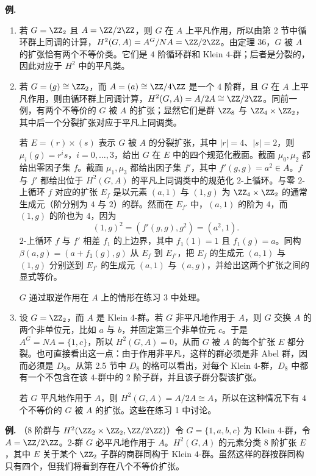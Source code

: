 \noindent\textbf{例.}
\begin{enumerate}[label=(\arabic*)]
  \item 若 $G=\ZZ_2$ 且 $A=\ZZ/2\ZZ$，则 $G$ 在 $A$ 上平凡作用，所以由第 2 节中循环群上同调的计算，$H^2(G,A)=A^G/NA=\ZZ/2\ZZ$。由定理 36，$G$ 被 $A$ 的扩张恰有两个不等价类。它们是 $4$ 阶循环群和 Klein $4$-群；后者是分裂的，因此对应于 $H^2$ 中的平凡类。

  \item 若 $G=(g)\cong\ZZ_2$，而 $A=(a)\cong\ZZ/4\ZZ$ 是一个 $4$ 阶群，且 $G$ 在 $A$ 上平凡作用，则由循环群上同调计算，$H^2(G,A)=A/2A\cong\ZZ/2\ZZ$。同前一例，有两个不等价的 $G$ 被 $A$ 的扩张；显然它们是群 $\ZZ_8$ 与 $\ZZ_4\times\ZZ_2$，其中后一个分裂扩张对应于平凡上同调类。

  若 $E=(r)\times(s)$ 表示 $G$ 被 $A$ 的分裂扩张，其中 $|r|=4$、$|s|=2$，则 $\mu_i(g)=r^is$，$i=0,\ldots,3$，给出 $G$ 在 $E$ 中的四个规范化截面。截面 $\mu_0,\mu_2$ 都给出零因子集 $f$。截面 $\mu_1,\mu_3$ 都给出因子集 $f'$，其中 $f'(g,g)=a^2\in A$。$f$ 与 $f'$ 都给出位于 $H^2(G,A)$ 的平凡上同调类中的规范化 $2$-上循环。与零 $2$-上循环 $f$ 对应的扩张 $E_f$ 是以元素 $(a,1)$ 与 $(1,g)$ 为 $\ZZ_4\times\ZZ_2$ 的通常生成元（阶分别为 $4$ 与 $2$）的群。然而在 $E_{f'}$ 中，$(a,1)$ 的阶为 $4$，而 $(1,g)$ 的阶也为 $4$，因为
  \[
    (1,g)^2=(f'(g,g),g^2)=(a^2,1).
  \]
  $2$-上循环 $f$ 与 $f'$ 相差 $f_1$ 的上边界，其中 $f_1(1)=1$ 且 $f_1(g)=a$。同构 $\beta(a,g)=(a+f_1(g),g)$ 从 $E_f$ 到 $E_{f'}$，把 $E_f$ 的生成元 $(a,1)$ 与 $(1,g)$ 分别送到 $E_{f'}$ 的生成元 $(a,1)$ 与 $(a,g)$，并给出这两个扩张之间的显式等价。

  $G$ 通过取逆作用在 $A$ 上的情形在练习 3 中处理。

  \item 设 $G=\ZZ_2$，而 $A$ 是 Klein $4$-群。若 $G$ 非平凡地作用于 $A$，则 $G$ 交换 $A$ 的两个非单位元，比如 $a$ 与 $b$，并固定第三个非单位元 $c$。于是 $A^G=NA=\{1,c\}$，所以 $H^2(G,A)=0$，从而 $G$ 被 $A$ 的每个扩张 $E$ 都分裂。也可直接看出这一点：由于作用非平凡，这样的群必须是非 Abel 群，因而必须是 $D_8$。从第 2.5 节中 $D_8$ 的格可以看出，对每个 Klein $4$-群，$D_8$ 中都有一个不包含在该 $4$-群中的 $2$ 阶子群，并且该子群分裂该扩张。

  若 $G$ 平凡地作用于 $A$，则 $H^2(G,A)=A/2A\cong A$，所以在这种情况下有 $4$ 个不等价的 $G$ 被 $A$ 的扩张。这些在练习 1 中讨论。
\end{enumerate}

\noindent\textbf{例.} （$8$ 阶群与 $H^2(\ZZ_2\times\ZZ_2,\ZZ/2\ZZ)$）令 $G=\{1,a,b,c\}$ 为 Klein $4$-群，令 $A=\ZZ/2\ZZ$。$2$-群 $G$ 必平凡地作用于 $A$。$H^2(G,A)$ 的元素分类 $8$ 阶扩张 $E$，其中 $E$ 关于某个 $\ZZ_2$ 子群的商群同构于 Klein $4$-群。虽然这样的群按群同构只有四个，但我们将看到存在八个不等价扩张。

